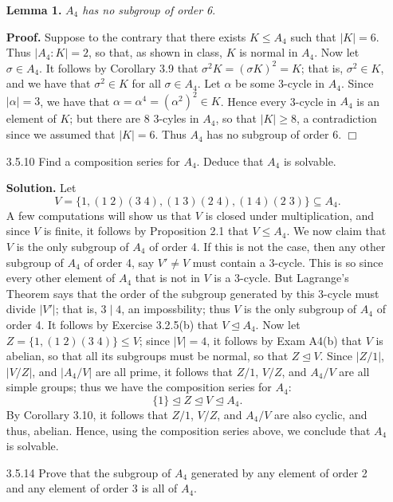 \documentclass[9pt]{article}
\newcommand{\qed}{\hfill \ensuremath{\Box}}
\begin{document}
\begin{enumerate}
   \item[\textbf{Lemma 1.}] \textit{$A_4$ has no subgroup of order 6}.
   
   \textbf{Proof.} Suppose to the contrary that there exists $K \le A_4$ such 
   that $|K| = 6$. Thus $|A_4 : K| = 2$, so that, as shown in class, $K$ is 
   normal in $A_4$. Now let $\sigma \in A_4$. It follows by Corollary 3.9 that
   $\sigma^2K = (\sigma K)^2 = K$; that is, $\sigma^2 \in K$, and we have that
   $\sigma^2 \in K$ for all $\sigma \in A_4$. Let $\alpha$ be some 3-cycle in
   $A_4$. Since $|\alpha| = 3$, we have that
   $\alpha = \alpha^4 = (\alpha^2)^2 \in K$. Hence every 3-cycle in $A_4$ is
   an element of $K$; but there are 8 3-cyles in $A_4$, so that $|K| \ge 8$,
   a contradiction since we assumed that $|K| = 6$. Thus $A_4$ has no subgroup
   of order 6. \qed
   \item[3.5.10]  Find a composition series for $A_4$. Deduce that $A_4$ is
                  solvable.
                  
      \textbf{Solution.} Let
      $$V = \{1, (1\;2)(3\;4), (1\;3)(2\;4), (1\;4)(2\;3)\} \subseteq A_4.$$
      A few computations will show us that $V$ is closed under multiplication,
      and since $V$ is finite, it follows by Proposition 2.1 that $V \le A_4$.
      We now claim that $V$ is the only subgroup of $A_4$ of order 4. If this is
      not the case, then any other subgroup of $A_4$ of order 4, say $V' \neq V$
      must contain a 3-cycle. This is so since every other element of $A_4$ that
      is not in $V$ is a 3-cycle. But Lagrange's Theorem says that the order of
      the subgroup generated by this 3-cycle must divide $|V'|$; that is,
      $3 \mid 4$, an impossbility; thus $V$ is the only subgroup of $A_4$ of 
      order 4. It follows by Exercise 3.2.5(b) that $V \trianglelefteq A_4$. Now 
      let $Z = \{1, (1\;2)(3\;4)\} \le V$; since $|V| = 4$, it follows by
      Exam A4(b) that $V$ is abelian, so that all its subgroups must be
      normal, so that $Z \trianglelefteq V$. Since $|Z/{1}|$, $|V/Z|$, and
      $|A_4/V|$ are all prime, it follows that $Z/{1}$, $V/Z$, and $A_4/V$ are
      all simple groups; thus we have the composition series for $A_4$:
      $$\{1\} \trianglelefteq Z \trianglelefteq V \trianglelefteq A_4.$$
      By Corollary 3.10, it follows that $Z/{1}$, $V/Z$, and $A_4/V$ are also
      cyclic, and thus, abelian. Hence, using the composition series above, we
      conclude that $A_4$ is solvable.
   \item[3.5.14]  Prove that the subgroup of $A_4$ generated by any element of
                  order 2 and any element of order 3 is all of $A_4$.
                  

\end{enumerate}
\end{document}
